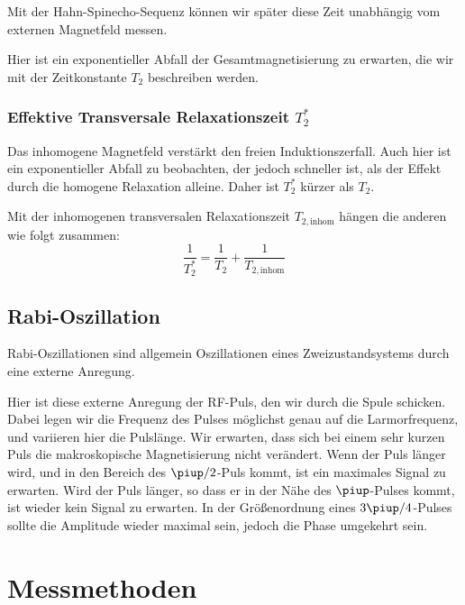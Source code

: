 Mit der Hahn-Spinecho-Sequenz können wir später diese Zeit unabhängig vom
externen Magnetfeld messen.

Hier ist ein exponentieller Abfall der Gesamtmagnetisierung zu erwarten, die
wir mit der Zeitkonstante $T_2$ beschreiben werden.

\subsubsection{Effektive Transversale Relaxationszeit $T_2^*$}

Das inhomogene Magnetfeld verstärkt den freien Induktionszerfall. Auch hier ist
ein exponentieller Abfall zu beobachten, der jedoch schneller ist, als der
Effekt durch die homogene Relaxation alleine. Daher ist $T_2^*$ kürzer als
$T_2$.

Mit der inhomogenen transversalen Relaxationszeit $T_{2,\text{inhom}}$ hängen
die anderen wie folgt zusammen: \parencite[Formel~P443.5]{physik412-Anleitung}
\begin{equation}
    \label{eq:}
    \frac{1}{T_2^*} = \frac 1{T_2} + \frac{1}{T_{2,\text{inhom}}}
\end{equation}

\subsection{Rabi-Oszillation}

Rabi-Oszillationen sind allgemein Oszillationen eines Zweizustandsystems durch
eine externe Anregung. \cite{wikipedia/Rabi_Oszillation}

Hier ist diese externe Anregung der RF-Puls, den wir durch die Spule schicken.
Dabei legen wir die Frequenz des Pulses möglichst genau auf die Larmorfrequenz,
und variieren hier die Pulslänge. Wir erwarten, dass sich bei einem sehr kurzen
Puls die makroskopische Magnetisierung nicht verändert. Wenn der Puls länger
wird, und in den Bereich des $\piup/2$-Puls kommt, ist ein maximales Signal zu
erwarten. Wird der Puls länger, so dass er in der Nähe des $\piup$-Pulses
kommt, ist wieder kein Signal zu erwarten. In der Größenordnung eines
$3\piup/4$-Pulses sollte die Amplitude wieder maximal sein, jedoch die Phase
umgekehrt sein.

\cite[Abschnitt~15.9.5 „Rabi-Atomstrahlresonanz”]{meschede-gerthsen_24}

\section{Messmethoden}

